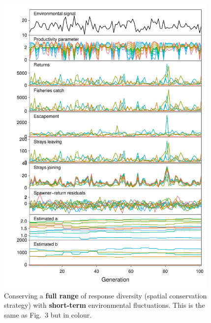 \begin{figure}[htbp]
\centering
\includegraphics[width=4.3in]{metafolio/spatial-arma-sim-full-colour}
\caption{Conserving a \textbf{full range} of response diversity (spatial
conservation strategy) with \textbf{short-term} environmental fluctuations. This is the same as Fig.~3 but in colour.}
\label{f:eg-sp-arma-full}
\end{figure}

\clearpage

